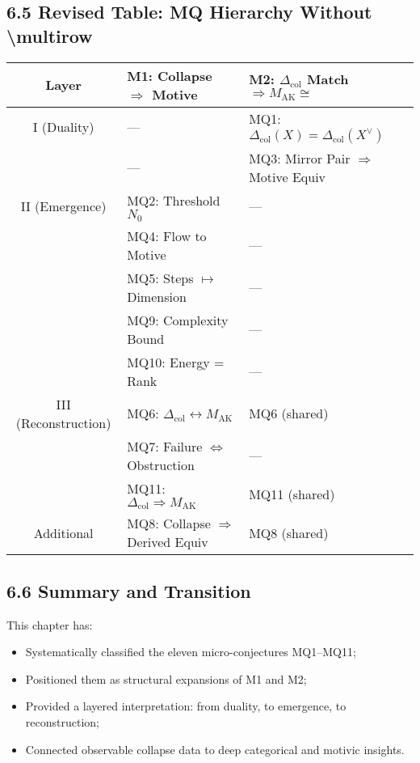 \documentclass[11pt]{article}
\begin{document}
\subsection{6.5 Revised Table: MQ Hierarchy Without \textbackslash multirow}

\vspace{0.8em}
\begin{center}
\begin{tabular}{|c|l|l|}
\hline
\textbf{Layer} & \textbf{M1: Collapse $\Rightarrow$ Motive} & \textbf{M2: $\Delta_{\mathrm{col}}$ Match $\Rightarrow M_{\mathrm{AK}} \cong$} \\
\hline
I (Duality) & --- & MQ1: $\Delta_{\mathrm{col}}(X) = \Delta_{\mathrm{col}}(X^\vee)$ \\
            & --- & MQ3: Mirror Pair $\Rightarrow$ Motive Equiv \\
\hline
II (Emergence) & MQ2: Threshold $N_0$ & --- \\
               & MQ4: Flow to Motive & --- \\
               & MQ5: Steps $\mapsto$ Dimension & --- \\
               & MQ9: Complexity Bound & --- \\
               & MQ10: Energy = Rank & --- \\
\hline
III (Reconstruction) & MQ6: $\Delta_{\mathrm{col}} \leftrightarrow M_{\mathrm{AK}}$ & MQ6 (shared) \\
                     & MQ7: Failure $\iff$ Obstruction & --- \\
                     & MQ11: $\Delta_{\mathrm{col}} \Rightarrow M_{\mathrm{AK}}$ & MQ11 (shared) \\
\hline
Additional & MQ8: Collapse $\Rightarrow$ Derived Equiv & MQ8 (shared) \\
\hline
\end{tabular}
\end{center}



\subsection{6.6 Summary and Transition}

This chapter has:

\begin{itemize}
    \item Systematically classified the eleven micro-conjectures MQ1–MQ11;
    \item Positioned them as structural expansions of M1 and M2;
    \item Provided a layered interpretation: from duality, to emergence, to reconstruction;
    \item Connected observable collapse data to deep categorical and motivic insights.
\end{itemize}
\end{document}
